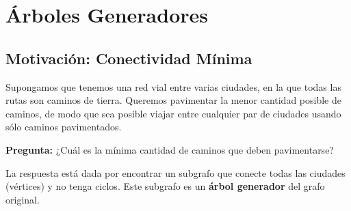 
\section{Árboles Generadores}

\subsection{Motivación: Conectividad Mínima}

Supongamos que tenemos una red vial entre varias ciudades, en la que todas las rutas son caminos de tierra. Queremos pavimentar la menor cantidad posible de caminos, de modo que sea posible viajar entre cualquier par de ciudades usando sólo caminos pavimentados.

\begin{center}
\end{center}


\textbf{Pregunta:} ¿Cuál es la mínima cantidad de caminos que deben pavimentarse?


\medskip

La respuesta está dada por encontrar un subgrafo que conecte todas las ciudades (vértices) y no tenga ciclos. Este subgrafo es un \textbf{árbol generador} del grafo original.

\begin{center}
\end{center}

